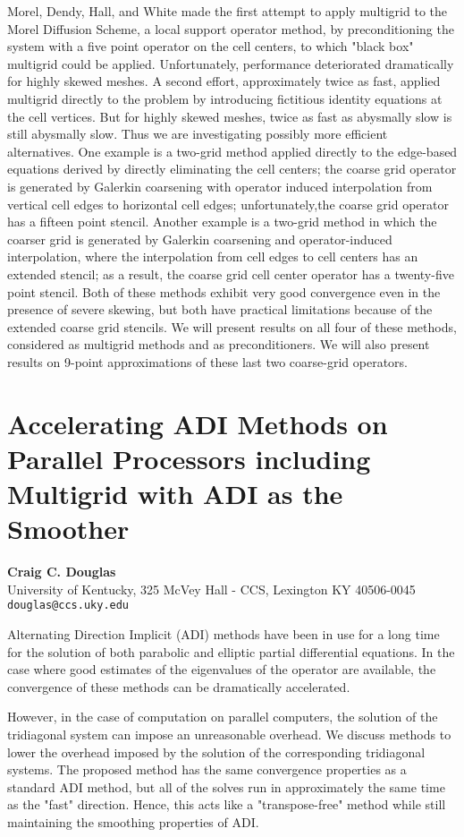 \documentclass[11pt]{article}
\newcommand{\nextab}[4]{
	\section{#2}
	{\bf #1} \\ \nopagebreak
	{#3} \\ \nopagebreak
	{\tt #4} \nopagebreak
	}
\begin{document}
Morel, Dendy, Hall, and White made the first attempt to apply
multigrid to the Morel Diffusion Scheme, a local support operator
method, by preconditioning the system with a five point operator on
the cell centers, to which "black box" multigrid could be
applied. Unfortunately, performance deteriorated dramatically for
highly skewed meshes. A second effort, approximately twice as fast,
applied multigrid directly to the problem by introducing fictitious
identity equations at the cell vertices. But for highly skewed meshes,
twice as fast as abysmally slow is still abysmally slow.  Thus we are
investigating possibly more efficient alternatives.  One example is a
two-grid method applied directly to the edge-based equations derived
by directly eliminating the cell centers; the coarse grid operator is
generated by Galerkin coarsening with operator induced interpolation
from vertical cell edges to horizontal cell edges; unfortunately,the
coarse grid operator has a fifteen point stencil.  Another example is
a two-grid method in which the coarser grid is generated by Galerkin
coarsening and operator-induced interpolation, where the interpolation
from cell edges to cell centers has an extended stencil; as a result,
the coarse grid cell center operator has a twenty-five point
stencil. Both of these methods exhibit very good convergence even in
the presence of severe skewing, but both have practical limitations
because of the extended coarse grid stencils. We will present results
on all four of these methods, considered as multigrid methods and as
preconditioners. We will also present results on 9-point
approximations of these last two coarse-grid operators.


\nextab{Craig C. Douglas}
	{Accelerating ADI Methods on Parallel Processors
	including Multigrid with ADI as the Smoother}
	{University of Kentucky,
		325 McVey Hall - CCS, Lexington KY 40506-0045}
	{douglas@ccs.uky.edu}

Alternating Direction Implicit (ADI) methods have been in use for a long time
for the solution of both parabolic and elliptic partial differential
equations.  In the case where good estimates of the eigenvalues of the
operator are available, the convergence of these methods can be dramatically
accelerated.

However, in the case of computation on parallel computers, the solution of the
tridiagonal system can impose an unreasonable overhead.  We discuss methods to
lower the overhead imposed by the solution of the corresponding tridiagonal
systems.  The proposed method has the same convergence properties as a
standard ADI method, but all of the solves run in approximately the same time
as the "fast" direction.  Hence, this acts like a "transpose-free" method
while still maintaining the smoothing properties of ADI.
\end{document}
